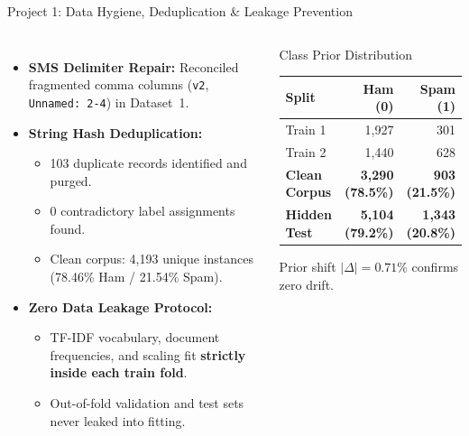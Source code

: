 \documentclass[aspectratio=169,10pt]{beamer}
\begin{document}
\begin{frame}{Project 1: Data Hygiene, Deduplication \& Leakage Prevention}
\begin{columns}
\begin{itemize}
  \item \textbf{SMS Delimiter Repair:} Reconciled fragmented comma columns (\texttt{v2}, \texttt{Unnamed: 2-4}) in Dataset~1.
  \item \textbf{String Hash Deduplication:}
  \begin{itemize}
    \item 103 duplicate records identified and purged.
    \item 0 contradictory label assignments found.
    \item Clean corpus: 4,193 unique instances (78.46\% Ham / 21.54\% Spam).
  \end{itemize}
  \item \textbf{Zero Data Leakage Protocol:}
  \begin{itemize}
    \item TF-IDF vocabulary, document frequencies, and scaling fit \textbf{strictly inside each train fold}.
    \item Out-of-fold validation and test sets never leaked into fitting.
  \end{itemize}
\end{itemize}
\begin{block}{Class Prior Distribution}
\centering
\begin{tabular}{l r r}
\toprule
\textbf{Split} & \textbf{Ham (0)} & \textbf{Spam (1)} \\
\midrule
Train 1 & 1,927 & 301 \\
Train 2 & 1,440 & 628 \\
\textbf{Clean Corpus} & \textbf{3,290 (78.5\%)} & \textbf{903 (21.5\%)} \\
\textbf{Hidden Test} & \textbf{5,104 (79.2\%)} & \textbf{1,343 (20.8\%)} \\
\bottomrule
\end{tabular}
\vspace{0.1in}
\footnotesize Prior shift $|\Delta| = 0.71\%$ confirms zero drift.
\end{block}
\end{columns}
\end{frame}
\end{document}
